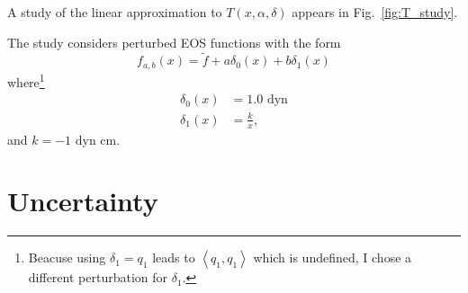 \documentclass[]{article}
\newcommand{\nomf}{\tilde f} \newcommand{\COST}{\cal C}
\newcommand\inner[2]{\left<#1,#2\right>}
\begin{document}
A study of the linear approximation to $T(x,\alpha,\delta)$ appears in
Fig.~\ref{fig:T_study}.
\begin{figure*}
  \centering
    \caption{A study of a linear approximation of the dependence of
      $T(x_f,\delta)$ on perturbations.  The perturbing function
      $\delta_1$ appears in the upper plot. In the middle plot $q_1$
      appears.  Changes in $T(x_f)$ appear in the lower plot.
      Equation~\eqref{eq:EOS_ab} describes how the perturbations
      depend on parameters $a$ and $b$.  For the bottom plot, $a$
      takes one of the three values $\{-15,0,15\}\times10^8$ and $b$
      sweeps over the range $[-15,15]\times10^8$ in 21 steps.  The red
      traces are direct calculations $T(a,b) - T(x_f)$ and the green
      traces are the linear approximation $\hat T(a,b) - T(x_f) \equiv
      a \inner{q_1}{\delta_0} + b \inner{q_1}{\delta_1}$.}
  \label{fig:T_study}
\end{figure*}
The study considers perturbed EOS functions with the form
\begin{equation}
  \label{eq:EOS_ab}
  f_{a,b}(x) = \nomf + a \delta_0(x) + b \delta_1(x)
\end{equation}
where\footnote{Beacuse using $\delta_1 = q_1$ leads to
  $\inner{q_1}{q_1}$ which is undefined, I chose a different
  perturbation for $\delta_1$.}
\begin{align}
  \label{eq:delta0}
  \delta_0(x) &= 1.0 \text{ dyn}\\
  \label{eq:delta1}
  \delta_1(x) &= \frac{k}{x},
\end{align}
and $k=-1\text{ dyn cm}$.

\section{Uncertainty}
\label{sec:uncertainty}
\end{document}
